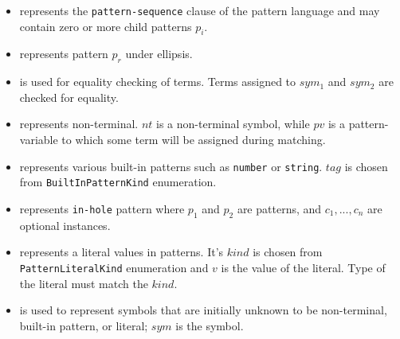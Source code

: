 \begin{itemize}
\item
\PatternSequence \space represents the \texttt{pattern-sequence} clause of the pattern language and may contain zero or more child patterns $p_i$. 

\item 
\PatternRepeat \space represents pattern $p_r$ under ellipsis.

\item
\PatternCheckConstraint is used for equality checking of terms. Terms assigned to $sym_1$ and $sym_2$ are checked for equality.

\item 
\NonTerminal \space represents non-terminal. $nt$ is a non-terminal symbol, while $pv$ is a pattern-variable to which some term will be assigned during matching. 

\item
\BuiltInPattern \space represents various built-in patterns such as \texttt{number} or \texttt{string}. $tag$ is chosen from \texttt{BuiltInPatternKind} enumeration.

\item
\PatternInHole \space represents \texttt{in-hole} pattern where $p_1$ and $p_2$ are patterns, and $c_1, ..., c_n$ are optional \ConstraintCheckNoArg instances.

\item 
\LiteralPattern \space represents a literal values in patterns. It's $kind$ is chosen from \texttt{PatternLiteralKind} enumeration and $v$ is the value of the literal. Type of the literal must match the $kind$.

\item 
\UnresolvedSymbol is used to represent symbols that are initially unknown to be non-terminal, built-in pattern, or literal; $sym$ is the symbol.

\end{itemize}
